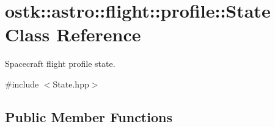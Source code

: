 \hypertarget{classostk_1_1astro_1_1flight_1_1profile_1_1_state}{}\section{ostk\+:\+:astro\+:\+:flight\+:\+:profile\+:\+:State Class Reference}
\label{classostk_1_1astro_1_1flight_1_1profile_1_1_state}


Spacecraft flight profile state.  




{\ttfamily \#include $<$State.\+hpp$>$}

\subsection*{Public Member Functions}
